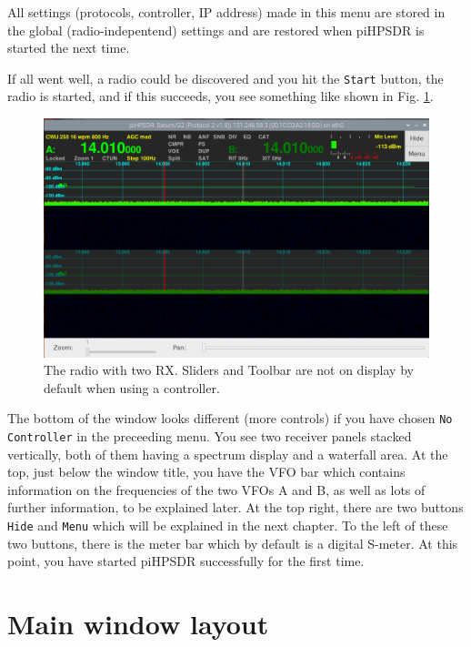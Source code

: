 \documentclass[12pt]{book}
\def\rett#1{\texttt{\color{red}#1}}
\begin{document}
All settings (protocols, controller, IP address) made in this menu are stored in the global (radio-indepentend) settings
and are restored when piHPSDR is started the next time. 

If all went well, a radio could be discovered and you hit the \rett{Start} button, the radio is started, and
if this succeeds, you see something like shown in Fig. \ref{fig:FirstDisplay}.

\begin{figure}
\center
\includegraphics[width=12cm]{FirstDisplay.png}
\caption{The radio with two RX. Sliders and Toolbar are not on display
by default when using a controller.}
\label{fig:FirstDisplay}
\end{figure}

The bottom of the window looks different (more controls) if you have chosen \rett{No Controller} in the preceeding menu.
You see two receiver panels stacked vertically, both of them having a spectrum display and a waterfall area. At the top,
just below the window title, you have the VFO bar which contains information on the frequencies of the two VFOs A and B,
as well as lots of further information, to be explained later. At the top right, there are two buttons \rett{Hide}
and \rett{Menu} which will be explained in the next chapter. To the left of these two buttons, there is the meter
bar which by default is a digital S-meter. At this point, you have started piHPSDR successfully for the first time.

\chapter{Main window layout}
\end{document}
